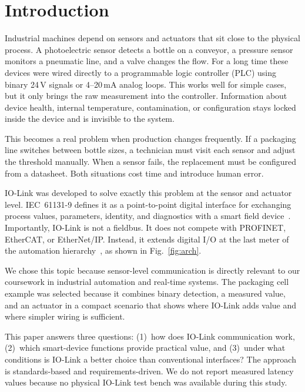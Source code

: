 \documentclass[conference]{IEEEtran}
\begin{document}
\section{Introduction}
\label{sec:intro}

Industrial machines depend on sensors and actuators that sit close to
the physical process. A photoelectric sensor detects a bottle on a
conveyor, a pressure sensor monitors a pneumatic line, and a valve
changes the flow. For a long time these devices were wired directly to
a programmable logic controller (PLC) using binary 24\,V signals or
4--20\,mA analog loops. This works well for simple cases, but it only
brings the raw measurement into the controller. Information about
device health, internal temperature, contamination, or configuration
stays locked inside the device and is invisible to the system.

This becomes a real problem when production changes frequently. If a
packaging line switches between bottle sizes, a technician must visit
each sensor and adjust the threshold manually. When a sensor fails, the
replacement must be configured from a datasheet. Both situations cost
time and introduce human error.

IO-Link was developed to solve exactly this problem at the sensor and
actuator level. IEC~61131-9 defines it as a point-to-point digital
interface for exchanging process values, parameters, identity, and
diagnostics with a smart field device~\cite{iec61131}. Importantly,
IO-Link is not a fieldbus. It does not compete with PROFINET, EtherCAT,
or EtherNet/IP. Instead, it extends digital I/O at the last meter of
the automation hierarchy~\cite{iols_spec,iols_sysdesc}, as shown in
Fig.~\ref{fig:arch}.

We chose this topic because sensor-level communication is directly
relevant to our coursework in industrial automation and real-time
systems. The packaging cell example was selected because it combines
binary detection, a measured value, and an actuator in a compact
scenario that shows where IO-Link adds value and where simpler wiring
is sufficient.

This paper answers three questions: (1)~how does IO-Link communication
work, (2)~which smart-device functions provide practical value, and
(3)~under what conditions is IO-Link a better choice than conventional
interfaces? The approach is standards-based and requirements-driven. We
do not report measured latency values because no physical IO-Link test
bench was available during this study.
\end{document}
